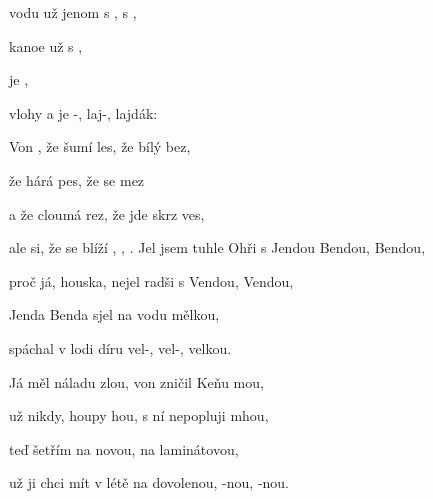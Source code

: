 
\zs
{} vodu už  jenom s , s ,

 kanoe  už s  ,

   je ,

 vlohy a je -, laj-, lajdák:
\ks

\zr
Von , že šumí les, že  bílý bez,

že  hárá pes, že  se mez

a že  cloumá rez, že  jde skrz ves,

ale  si, že se blíží , , .
\kr
\zs
Jel jsem tuhle Ohři s Jendou Bendou, Bendou,

proč já, houska, nejel radši s Vendou, Vendou,

Jenda Benda sjel na vodu mělkou, 

spáchal v lodi díru vel-, vel-, velkou.
\ks

\zr
Já měl náladu zlou, von zničil Keňu mou,

už nikdy, houpy hou, s ní nepopluji mhou,

teď šetřím na novou, na laminátovou,

už ji chci mít v létě na dovolenou, -nou, -nou.
\kr
\kp


